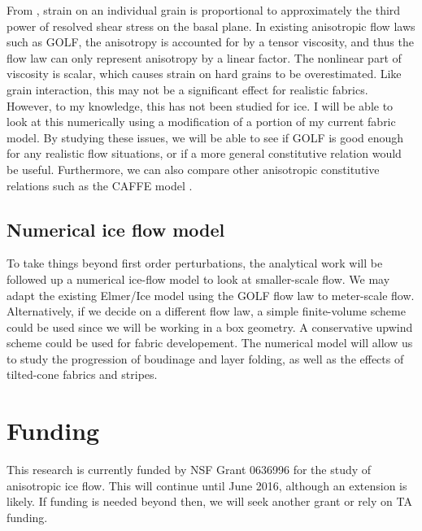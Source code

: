 \documentclass{article}
\begin{document}
From \citet{azuma94}, strain on an individual grain is proportional to approximately the third power of resolved shear stress on the basal plane. In existing anisotropic flow laws such as GOLF, the anisotropy is accounted for by a tensor viscosity, and thus the flow law can only represent anisotropy by a linear factor. The nonlinear part of viscosity is scalar, which causes strain on hard grains to be overestimated. Like grain interaction, this may not be a significant effect for realistic fabrics. However, to my knowledge, this has not been studied for ice. I will be able to look at this numerically using a modification of a portion of my current fabric model. By studying these issues, we will be able to see if GOLF is good enough for any realistic flow situations, or if a more general constitutive relation would be useful. Furthermore, we can also compare other anisotropic constitutive relations such as the CAFFE model \citep{placidi2010}. 

\subsection{Numerical ice flow model}
To take things beyond first order perturbations, the analytical work will be followed up a numerical ice-flow model to look at smaller-scale flow. We may adapt the existing Elmer/Ice model using the GOLF flow law to meter-scale flow. Alternatively, if we decide on a different flow law, a simple finite-volume scheme could be used since we will be working in a box geometry. A conservative upwind scheme could be used for fabric developement. The numerical model will allow us to study the progression of boudinage and layer folding, as well as the effects of tilted-cone fabrics and stripes.  

\section{Funding}
This research is currently funded by NSF Grant 0636996 for the study of anisotropic ice flow. This will continue until June 2016, although an extension is likely. If funding is needed beyond then, we will seek another grant or rely on TA funding. 



\end{document}
